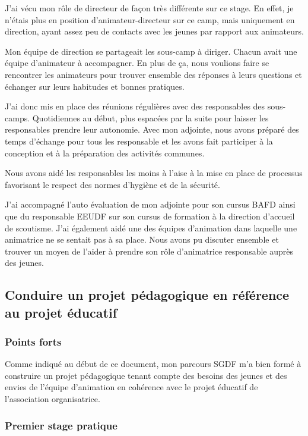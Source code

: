 \documentclass[titlepage,11pt,a4paper]{article}
\begin{document}
J'ai vécu mon rôle de directeur de façon très différente sur ce stage. En effet,
je n'étais plus en position d’animateur-directeur sur ce camp, mais uniquement en
direction, ayant assez peu de contacts avec les jeunes par rapport aux animateurs.

Mon équipe de direction se partageait les sous-camp à diriger. Chacun avait une équipe
d'animateur à accompagner. En plus de ça, nous voulions faire se rencontrer les animateurs pour
trouver ensemble des réponses à leurs questions et échanger sur leurs habitudes et bonnes
pratiques.

J'ai donc mis en place des réunions régulières avec des responsables des sous-camps.
Quotidiennes au début, plus espacées par la suite pour laisser les responsables prendre leur autonomie.
Avec mon adjointe, nous avons préparé des temps d'échange pour tous les responsable et les
avons fait participer à la conception et à la préparation des activités communes.

Nous avons aidé les responsables les moins à l'aise à
la mise en place de processus favorisant le respect des normes d'hygiène et de la sécurité.

J'ai accompagné l'auto évaluation de mon adjointe pour son cursus BAFD ainsi que
du responsable EEUDF sur son cursus de formation à la direction d'accueil de scoutisme. J'ai
également aidé une des équipes d'animation dans laquelle une animatrice ne se
sentait pas à sa place. Nous avons pu discuter ensemble et trouver un moyen de l'aider à
prendre son rôle d'animatrice responsable auprès des jeunes.

\subsection{Conduire un projet pédagogique en référence au projet éducatif}

\subsubsection{Points forts}

Comme indiqué au début de ce document, mon parcours SGDF m'a bien formé à construire
un projet pédagogique tenant compte des besoins des jeunes et des
envies de l'équipe d'animation en cohérence avec le projet éducatif de l'association
organisatrice.

\subsubsection{Premier stage pratique}
\end{document}
